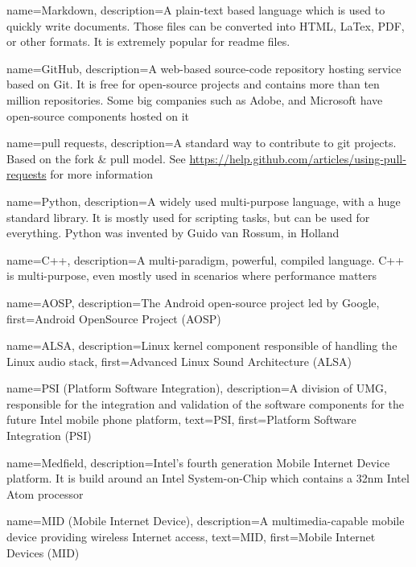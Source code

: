 {
  name=Markdown,
  description={A plain-text based language which is used to quickly write documents.
  Those files can be converted into HTML, LaTex, PDF, or other formats.
  It is extremely popular for readme files.}
}

{
  name=GitHub,
  description={A web-based source-code repository hosting service based on Git.
  It is free for open-source projects and contains more than ten million repositories.
  Some big companies such as Adobe, and Microsoft have open-source components hosted on
  it}
}

{
  name=pull requests,
  description={A standard way to contribute to git projects. Based on the fork \& pull model.
  See \url{https://help.github.com/articles/using-pull-requests} for more information}
}

{
  name=Python,
  description={A widely used multi-purpose language, with a huge standard library.
  It is mostly used for scripting tasks, but can be used for everything.
  Python was invented by Guido van Rossum, in Holland}
}

{
  name=C++,
  description={A multi-paradigm, powerful, compiled language. C++ is multi-purpose, even mostly used
  in scenarios where performance matters}
}

{
  name=AOSP,
  description={The Android open-source project led by Google},
  first=Android OpenSource Project (AOSP)
}

{
  name=ALSA,
  description={Linux kernel component responsible of handling the Linux audio stack},
  first=Advanced Linux Sound Architecture (ALSA)
}

{
  name=PSI (Platform Software Integration),
  description={A division of UMG, responsible for the integration and
    validation of the software components for the future Intel mobile
    phone platform},
  text=PSI,
  first=Platform Software Integration (PSI)
}

{
  name=Medfield,
  description={Intel's fourth generation Mobile Internet Device
    platform. It is build around an Intel System-on-Chip which
    contains a 32nm Intel Atom\textsuperscript{\texttrademark}
    processor}
}

{
  name=MID (Mobile Internet Device),
  description={A multimedia-capable mobile device providing wireless
    Internet access},
  text=MID,
  first=Mobile Internet Devices (MID)
}

